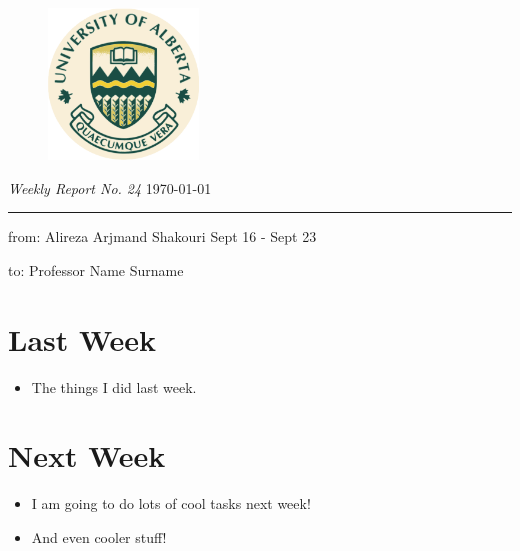 \documentclass{article}
\begin{document}
\begin{figure}[htp]
    \centering
    \includegraphics[width=4cm]{UofA_logo.png}
\end{figure}
\noindent
{\large {\em Weekly Report No. 24} \hfill \today\\}

\noindent
{\color{cute_green} \rule{\linewidth}{0.5mm} }

\noindent
{\large from: Alireza Arjmand Shakouri \hfill Sept 16 - Sept 23}

\doublespacing

\noindent
{\large to: Professor Name Surname}
\noindent

\section{Last Week}
\begin{itemize}
    \item The things I did last week.
\end{itemize}

\hfill
\section{Next Week}
\begin{itemize}
    \item I am going to do lots of cool tasks next week!
    \item And even cooler stuff!
\end{itemize}
\end{document}
